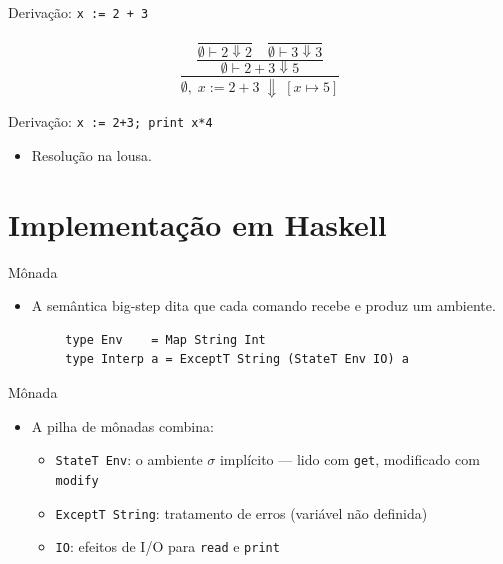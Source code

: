 \begin{frame}{Derivação: \texttt{x := 2 + 3}}

    \[\dfrac{
    \dfrac{
    \dfrac{}{\emptyset \vdash 2 \Downarrow 2}
    \quad
    \dfrac{}{\emptyset \vdash 3 \Downarrow 3}
    }{\emptyset \vdash 2 + 3 \Downarrow 5}
    }{\emptyset,\; x \mathbin{:=} 2 + 3 \;\Downarrow\; [x \mapsto 5]}\]
\end{frame}

\begin{frame}{Derivação: \texttt{x := 2+3; print x*4}}

    \begin{itemize}

        \item
        Resolução na lousa.
    \end{itemize}
\end{frame}


\section{Implementação em
Haskell}\label{implementauxe7uxe3o-em-haskell}

\begin{frame}[fragile]{Mônada}

    \begin{itemize}

        \item
        A semântica big-step dita que cada comando recebe e produz um
        ambiente.
    \end{itemize}

    \begin{lstlisting}
        type Env    = Map String Int
        type Interp a = ExceptT String (StateT Env IO) a
    \end{lstlisting}
\end{frame}

\begin{frame}[fragile]{Mônada}

    \begin{itemize}

        \item
        A pilha de mônadas combina:

        \begin{itemize}

            \item
            \texttt{StateT Env}: o ambiente \(\sigma\)
            implícito --- lido com \texttt{get}, modificado com
            \texttt{modify}
            \item
            \texttt{ExceptT String}: tratamento de erros
            (variável não definida)
            \item
            \texttt{IO}: efeitos de I/O para
            \texttt{read} e \texttt{print}
        \end{itemize}
    \end{itemize}
\end{frame}

